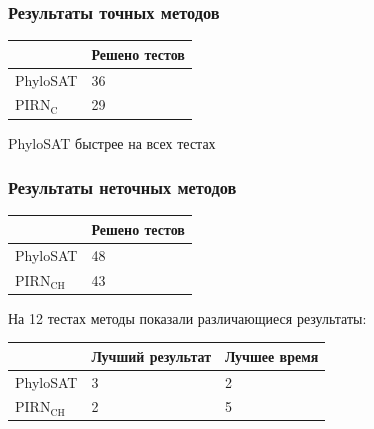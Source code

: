 \documentclass[hyperref={unicode}]{beamer}
\begin{document}
\begin{frame}
\frametitle{Результаты точных методов}

\begin{table}
\begin{tabular}{l | l}
	& Решено тестов \\
	\hline
	PhyloSAT & 36 \\
	PIRN$\mathrm{_C}$ & 29 \\
\end{tabular}
\end{table}

PhyloSAT быстрее на всех тестах

\end{frame}

\begin{frame}
\frametitle{Результаты неточных методов}

\begin{table}
\begin{tabular}{l | l}
	& Решено тестов \\
	\hline
	PhyloSAT & 48 \\
	PIRN$\mathrm{_{CH}}$ & 43 \\
\end{tabular}
\end{table}

На 12 тестах методы показали различающиеся результаты:

\begin{table}
\begin{tabular}{l | l | l}
	& Лучший результат & Лучшее время \\
	\hline
	PhyloSAT & 3 & 2 \\
	PIRN$\mathrm{_{CH}}$ & 2 & 5 \\
\end{tabular}
\end{table}

\end{frame}
\end{document}
